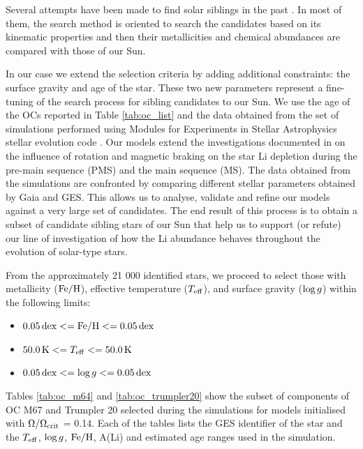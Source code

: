 \documentclass[fleqn,usenatbib]{mnras}
\begin{document}
Several attempts have been made to find solar siblings in the past \citep[see][and references therein]{Adibekyan2018}. In most of them, the search method is oriented to search the candidates based on its kinematic properties and then their metallicities and chemical abundances are compared with those of our Sun.\par

In our case we extend the selection criteria by adding additional constraints: the surface gravity and age of the star. These two new parameters represent a fine-tuning of the search process for sibling candidates to our Sun. We use the age of the OCs reported in Table \ref{tab:oc_list} and the data obtained from the set of simulations performed using Modules for Experiments in Stellar Astrophysics stellar evolution code \citep[MESA; ][]{Paxton2011, Paxton2013,Paxton2015, Paxton2018, Paxton2019}. Our models extend the investigations documented in \cite{Navarro2020} on the influence of rotation and magnetic braking on the star Li depletion during the pre-main sequence (PMS) and the main sequence (MS). The data obtained from the simulations are confronted by comparing different stellar parameters obtained by Gaia and GES. This allows us to analyse, validate and refine our models against a very large set of candidates. The end result of this process is to obtain a subset of candidate sibling stars of our Sun that help us to support (or refute) our line of investigation of how the Li abundance behaves throughout the evolution of solar-type stars.\par

From the approximately 21 000 identified stars, we proceed to select those with metallicity ($\mathrm{Fe}/\mathrm{H}$), effective temperature ($T_{\mathrm{eff}}$), and surface gravity ($\mathrm{log} \, g$) within the following limits:
\begin{itemize}
    \item $0.05 \, \mathrm{dex} <= \mathrm{Fe}/\mathrm{H} <= 0.05 \, \mathrm{dex}$
    \item $50.0 \, \mathrm{K} <= T_{\mathrm{eff}} <= 50.0 \, \mathrm{K}$
    \item $0.05 \, \mathrm{dex} <= \mathrm{log} \, g <= 0.05 \, \mathrm{dex}$
\end{itemize}

Tables \ref{tab:oc_m64} and \ref{tab:oc_trumpler20} show the subset of components of OC M67 and Trumpler 20 selected during the simulations for models initialised with $\Omega / \Omega_{\mathrm{crit}}$ = 0.14. Each of the tables lists the GES identifier of the star and the $T_{\mathrm{eff}}$, $\mathrm{log} \, g$, $\mathrm{Fe}/\mathrm{H}$, A(Li) and estimated age ranges used in the simulation.
\end{document}
